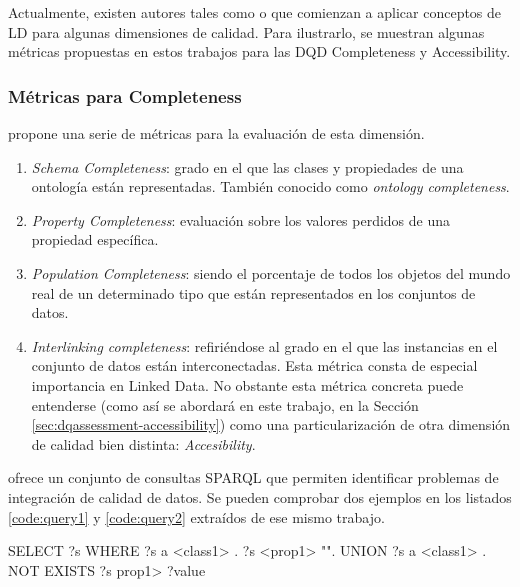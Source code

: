 Actualmente, existen autores tales como \cite{zaveri_quality_2013} o
\cite{Furber:2011:TVD:1966901.1966903} que comienzan a aplicar conceptos de
\acs{LD} para algunas dimensiones de calidad. Para ilustrarlo, se muestran
algunas métricas propuestas en estos trabajos para las \acs{DQD} Completeness y
Accessibility. 

\subsubsection{Métricas para Completeness}

\cite{zaveri_quality_2013} propone una serie de métricas para la evaluación de
esta dimensión. 

\begin{enumerate}
\item \textit{Schema Completeness}: grado en el que las clases y propiedades de
  una ontología están representadas. También conocido como \textit{ontology
    completeness}.

\item \textit{Property Completeness}: evaluación sobre los valores perdidos de
  una propiedad específica.

\item \textit{Population Completeness}: siendo el porcentaje de todos los
  objetos del mundo real de un determinado tipo que están representados en los
  conjuntos de datos. 

\item \textit{Interlinking completeness}: refiriéndose al grado en el que las
  instancias en el conjunto de datos están interconectadas. Esta métrica consta
  de especial importancia en Linked Data. No obstante esta métrica concreta
  puede entenderse (como así se abordará en este trabajo, en la Sección \ref{sec:dqassessment-accessibility}) como una
  particularización de otra dimensión de calidad bien distinta:
  \textit{Accesibility}. 

\end{enumerate}

\cite{conf/ekaw/FurberH10} ofrece un conjunto de consultas
\acs{SPARQL} que permiten identificar problemas de integración de calidad de
datos. Se pueden comprobar dos ejemplos en los listados
\ref{code:query1} y \ref{code:query2} extraídos de ese mismo trabajo. 



\begin{listing}[
  float=ht,
  language = SQL,
  numbers=left,
  numberstyle=\tiny,
  stepnumber=1,
  numbersep=5pt,
  frame=single,
  caption  = {Consulta \acs{SPARQL} para identificación de literales perdidos (I)},
  label    = code:query1]
SELECT ?s 
WHERE { {
  ?s a <class1> .
  ?s <prop1> "". }
UNION{
  ?s a <class1> .
  NOT EXISTS {
  ?s prop1> ?value}}}

\end{listing}



